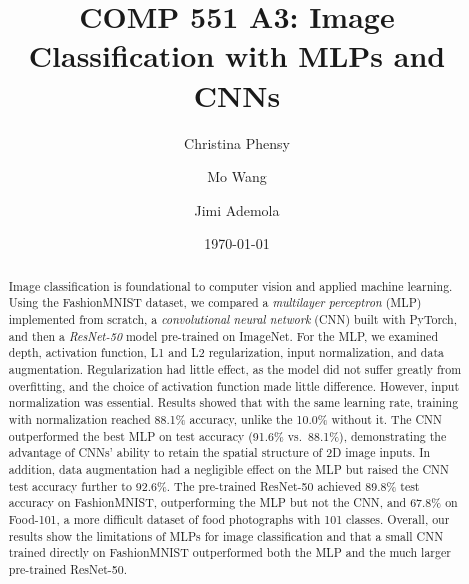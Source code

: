\documentclass[11pt]{article}
\title{COMP 551 A3: Image Classification with MLPs and CNNs}
\author{Christina Phensy \and Mo Wang \and Jimi Ademola}
\date{\today}
\begin{document}
\maketitle

\begin{abstract}
Image classification is foundational to computer vision and applied machine learning.
Using the FashionMNIST dataset, we compared a \textit{multilayer perceptron} (MLP) implemented from scratch, 
a \textit{convolutional neural network} (CNN) built with PyTorch, and then a \textit{ResNet-50} model pre-trained on ImageNet.
For the MLP, we examined depth, activation function, L1 and L2 regularization, input normalization, and data augmentation.
Regularization had little effect, as the model did not suffer greatly from overfitting, and the choice of activation function
made little difference.
However, input normalization was essential.
Results showed that with the same learning rate, training with normalization reached 88.1\% accuracy, unlike the 10.0\% without it.
The CNN outperformed the best MLP on test accuracy (91.6\% vs.\ 88.1\%), demonstrating the advantage of CNNs' ability to retain the 
spatial structure of 2D image inputs.
In addition, data augmentation had a negligible effect on the MLP but raised the CNN test accuracy further to 92.6\%.
The pre-trained ResNet-50 achieved 89.8\% test accuracy on FashionMNIST, outperforming the MLP but not the CNN, and 67.8\% on Food-101, 
a more difficult dataset of food photographs with 101 classes.
Overall, our results show the limitations of MLPs for image classification and that a small CNN trained directly on FashionMNIST 
outperformed both the MLP and the much larger pre-trained ResNet-50.
\end{abstract}
\end{document}

